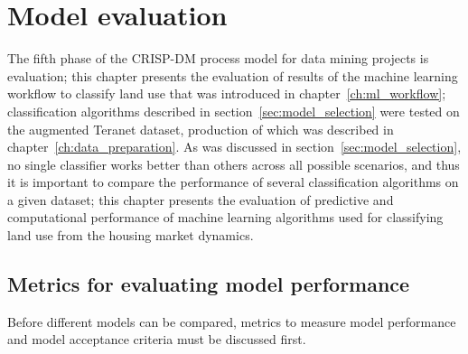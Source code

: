 \chapter{Model evaluation} \label{ch:model_evaluation}

The fifth phase of the CRISP-DM process model for data mining projects is evaluation;
this chapter presents the evaluation of results of the machine learning workflow to classify land use that was introduced in chapter~\ref{ch:ml_workflow};
classification algorithms described in section~\ref{sec:model_selection} were tested on the augmented Teranet dataset, production of which was described in chapter~\ref{ch:data_preparation}.
As was discussed in section~\ref{sec:model_selection}, no single classifier works better than others across all possible scenarios, and thus it is important to compare the performance of several classification algorithms on a given dataset;
this chapter presents the evaluation of predictive and computational performance of machine learning algorithms used for classifying land use from the housing market dynamics.

\section{Metrics for evaluating model performance} \label{sec:model_metrics}

Before different models can be compared, metrics to measure model performance and model acceptance criteria must be discussed first.

